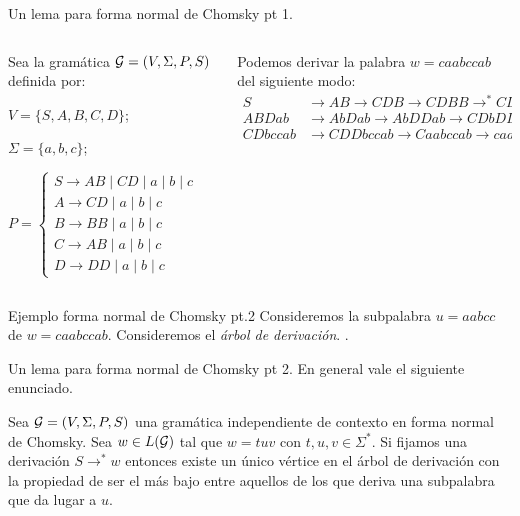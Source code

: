 \documentclass[aspectratio=169, 11pt]{beamer}
\begin{document}
	\begin{frame}[fragile]{Un lema para forma normal de Chomsky pt 1.}
		
		\begin{columns}
			
			\begin{column}{0.5\textwidth}
				Sea la gramática ${\cal G} = (V, \Sigma, P, S)$ definida por:
				
					 $V = \{ S,A,B,C,D \}$;

					 $\Sigma = \{ a,b,c \}$;
					 
						
						$P = \begin{cases}
								S \to AB \mid CD \mid a \mid b \mid c \\
								A \to CD \mid a \mid b \mid c	\\
								B \to BB \mid a \mid b \mid c	\\
								C \to AB \mid a \mid b \mid c	\\
								D \to DD \mid a \mid b \mid c
						\end{cases}$
						
				
			\end{column}

			\begin{column}{0.5 \textwidth}
				Podemos derivar la palabra $w = caabccab$ del siguiente modo:
				\begin{align*}
					S &\to AB \to CDB \to CDBB \to^{*} CDab \to \\
					ABDab & \to  AbDab   \to AbDDab  \to CDbDDab   \to\\
					CDbccab & \to CDDbccab \to Caabccab \to caabccab \\
				\end{align*}
			\end{column}
		\end{columns}
	\end{frame}

	
	\begin{frame}{Ejemplo forma normal de Chomsky pt.2}
		Consideremos la subpalabra $u  = aabcc$ de $w = caabccab$.
		Consideremos el \textit{árbol de derivación}.
		. 
		
	\end{frame}

	\begin{frame}[fragile]{Un lema para forma normal de Chomsky pt 2.}
		En general vale el siguiente enunciado.

		\begin{lemma}
			Sea ${\cal G} = (V, \Sigma, P, S)$ una gramática independiente de contexto en forma normal de Chomsky.
			Sea $w \in L({\cal G})$ tal que $w = tuv$ con $t,u,v \in \Sigma^{*}$. 
			Si fijamos una derivación $S \to^{*} w$ entonces existe un único vértice en el árbol de derivación con la propiedad de ser el más bajo entre aquellos de los que deriva una subpalabra que da lugar a $u$.
		\end{lemma}

	\end{frame}
	
\end{document}
